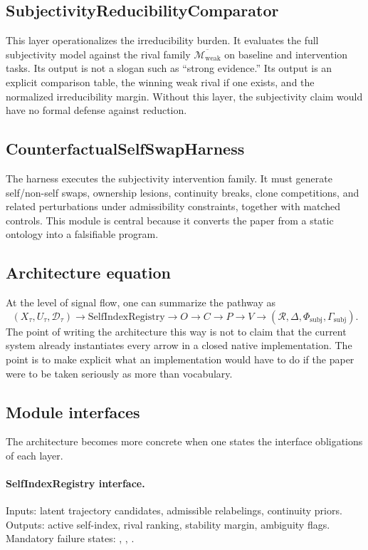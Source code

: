 \documentclass[11pt,a4paper]{article}
\theoremstyle{definition}
\newcommand{\WeakFam}{\mathcal{M}_{\mathrm{weak}}}
\newcommand{\WeakClosure}{\overline{\WeakFam}}
\newcommand{\OwnField}{O}
\newcommand{\ContField}{C}
\newcommand{\Persp}{P}
\newcommand{\ValAsym}{V}
\newcommand{\IntervProf}{\Delta}
\newcommand{\Irred}{\mathcal{R}}
\newcommand{\GateSubj}{\Gamma_{\mathrm{subj}}}
\newcommand{\PhiSubj}{\Phi_{\mathrm{subj}}}
\begin{document}
\subsection{SubjectivityReducibilityComparator}
This layer operationalizes the irreducibility burden. It evaluates the full subjectivity model against the rival family $\WeakClosure$ on baseline and intervention tasks. Its output is not a slogan such as ``strong evidence.'' Its output is an explicit comparison table, the winning weak rival if one exists, and the normalized irreducibility margin. Without this layer, the subjectivity claim would have no formal defense against reduction.

\subsection{CounterfactualSelfSwapHarness}
The harness executes the subjectivity intervention family. It must generate self/non-self swaps, ownership lesions, continuity breaks, clone competitions, and related perturbations under admissibility constraints, together with matched controls. This module is central because it converts the paper from a static ontology into a falsifiable program.

\subsection{Architecture equation}
At the level of signal flow, one can summarize the pathway as
\[
(X_\tau,U_\tau,\mathcal{D}_\tau)
\longrightarrow
\mathrm{SelfIndexRegistry}
\longrightarrow
\OwnField
\longrightarrow
\ContField
\longrightarrow
\Persp
\longrightarrow
\ValAsym
\longrightarrow
(\Irred,\IntervProf,\PhiSubj,\GateSubj).
\]
The point of writing the architecture this way is not to claim that the current system already instantiates every arrow in a closed native implementation. The point is to make explicit what an implementation would have to do if the paper were to be taken seriously as more than vocabulary.

\subsection{Module interfaces}
The architecture becomes more concrete when one states the interface obligations of each layer.

\paragraph{SelfIndexRegistry interface.}
Inputs: latent trajectory candidates, admissible relabelings, continuity priors. Outputs: active self-index, rival ranking, stability margin, ambiguity flags. Mandatory failure states: \texttt{\allowbreak{}\allowbreak{}}, \texttt{\allowbreak{}}, \texttt{\allowbreak{}\allowbreak{}\allowbreak{}}.
\end{document}
